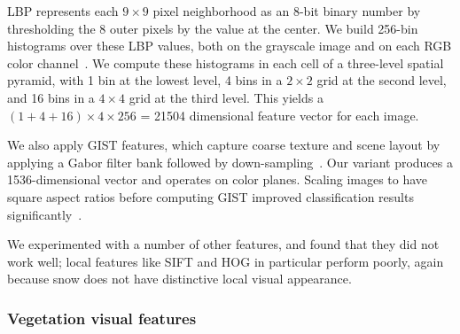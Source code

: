 \documentclass[10pt,journal,compsoc]{IEEEtran}
\begin{document}



 LBP represents each $9 \times 9$ pixel neighborhood 
as an 8-bit binary number by thresholding the 8 outer pixels
by the value at the center.  We build 256-bin histograms over
these LBP values, both on the grayscale image and on each RGB color
channel~\cite{korayem2012solving}. We compute these histograms in each cell of a three-level spatial
pyramid, with 1 bin at the lowest level, 4 bins in a $2 \times 2$ grid
at the second level, and 16 bins in a $4 \times 4$ grid at the third level.
This yields a $(1+4+16) \times 4 \times 256$ = 21504 dimensional feature
vector for each image.

 We also apply GIST features, which capture coarse texture
and scene layout by applying a Gabor filter bank followed by
down-sampling~\cite{oliva2001modeling}. Our variant produces a
1536-dimensional  vector and operates on color planes. Scaling
images to have square aspect ratios before computing GIST improved
classification results significantly~\cite{douze2009evaluation}.


We experimented with a number of other features, and found
that they did not work well; local features like SIFT and HOG in
particular perform poorly, again because snow does not have
distinctive local visual appearance. 

\subsubsection{Vegetation visual features}
\end{document}
